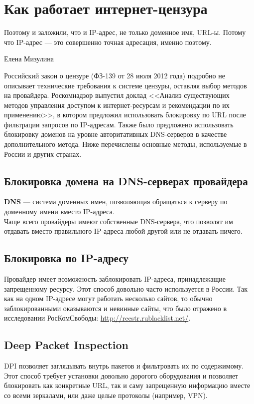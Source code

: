 \chapter{Как работает интернет-цензура}
\epigraph{Поэтому и заложили, что и IP-адрес, не только доменное имя, URL-ы. Потому что IP-адрес --- это совершенно точная адресация, именно поэтому.}{Елена Мизулина \cite{mizulina}}
Российский закон о цензуре (ФЗ-139 от 28 июля 2012 года) подробно не описывает технические требования к системе цензуры, оставляя выбор методов на провайдера. Роскомнадзор выпустил доклад <<Анализ существующих методов управления доступом к интернет-ресурсам и рекомендации по их применению>>, в котором предложил использовать блокировку по URL после фильтрации запросов по IP-адресам. Также было предложено использовать блокировку доменов на уровне авторитативных DNS-серверов в качестве дополнительного метода\cite{rsoc}. Ниже перечислены основные методы, используемые в России и других странах.
\section{Блокировка домена на DNS-серверах провайдера}
\textbf{DNS} --- система доменных имен, позволяющая обращаться к серверу по доменному имени вместо IP-адреса.\\
Чаще всего провайдеры имеют собственные DNS-сервера, что позволят им отдавать вместо правильного IP-адреса любой другой или не отдавать ничего.
\section{Блокировка по IP-адресу}
Провайдер имеет возможность заблокировать IP-адреса, принадлежащие запрещенному ресурсу. Этот способ довольно часто используется в России. Так как на одном IP-адресе могут работать несколько сайтов, то обычно заблокированными оказываются и невинные сайты, что было отражено в исследовании РосКомСвободы: \url{http://reestr.rublacklist.net/}.
\section{Deep Packet Inspection}
DPI позволяет заглядывать внутрь пакетов и фильтровать их по содержимому. Этот способ требует установки довольно дорогого оборудования и позволяет блокировать как конкретные URL, так и саму запрещенную информацию вместе со всеми зеркалами, или даже целые протоколы (например, VPN).
